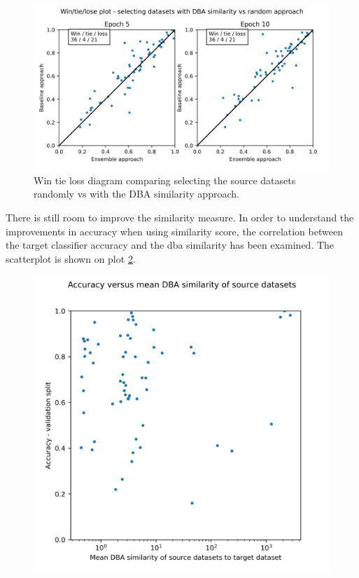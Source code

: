 \documentclass[a4paper,11pt,twoside]{report}
\theoremstyle{definition}
\begin{document}
\FloatBarrier
\begin{figure}[h!t]
\centering
\includegraphics[width=17cm]{imgs/dba_vs_random/win_tie_lose_epoch.png}
\caption{Win tie loss diagram comparing selecting the source datasets randomly vs with the DBA similarity approach.}
\label{fig:random_vs_dba_win_tie_loss}
\end{figure}
\FloatBarrier
There is still room to improve the similarity measure. In order to understand the improvements in accuracy when using similarity score, the correlation between the target classifier accuracy and the dba similarity has been examined. The scatterplot is shown on plot \ref{fig:acc_vs_dba_sim}.
\FloatBarrier
\begin{figure}[h!t]
\centering
\includegraphics[width=17cm]{imgs/ensemble/accuracy_vs_mean_dba_sim.png}
\caption{}
\label{fig:acc_vs_dba_sim}
\end{figure}
\FloatBarrier
\end{document}
